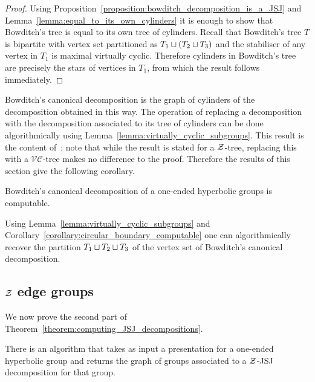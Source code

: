 \begin{proof}
  Using Proposition~\ref{proposition:bowditch_decomposition_is_a_JSJ} and Lemma~\ref{lemma:equal_to_its_own_cylinders} it is enough to show that Bowditch's tree is equal to its own tree of cylinders.
  Recall that Bowditch's tree $T$ is bipartite with vertex set partitioned as $T_1 \sqcup (T_2 \sqcup T_3)$ and the stabiliser of any vertex in $T_1$ is maximal virtually cyclic.
  Therefore cylinders in Bowditch's tree are precisely the stars of vertices in $T_1$, from which the result follows immediately.
\end{proof}

Bowditch's canonical decomposition is the graph of cylinders of the decomposition obtained in this way. 
The operation of replacing a decomposition with the decomposition associated to its tree of cylinders can be done algorithmically using Lemma~\ref{lemma:virtually_cyclic_subgroups}. 
This result is the content of~\cite[Lemma 2.34]{dahmaniguirardel11}; note that while the result is stated for a $\mathcal{Z}$-tree, replacing this with a $\mathcal{VC}$-tree makes no difference to the proof.
Therefore the results of this section give the following corollary.

\begin{corollary}
  Bowditch's canonical decomposition of a one-ended hyperbolic groups is computable.
\end{corollary}

\begin{remark}
  Using Lemma~\ref{lemma:virtually_cyclic_subgroups} and Corollary~\ref{corollary:circular_boundary_computable} one can algorithmically recover the partition $T_1 \sqcup T_2\sqcup T_3$  of the vertex set of Bowditch's canonical decomposition.
\end{remark}

\subsection{\texorpdfstring{$\mathcal{Z}$}{Z} edge groups}

We now prove the second part of Theorem~\ref{theorem:computing_JSJ_decompositions}.

\begin{theorem} There is an algorithm that takes as input a presentation for a one-ended hyperbolic group and returns the graph of groups associated to a $\mathcal{Z}$-JSJ decomposition for that group.\end{theorem}

